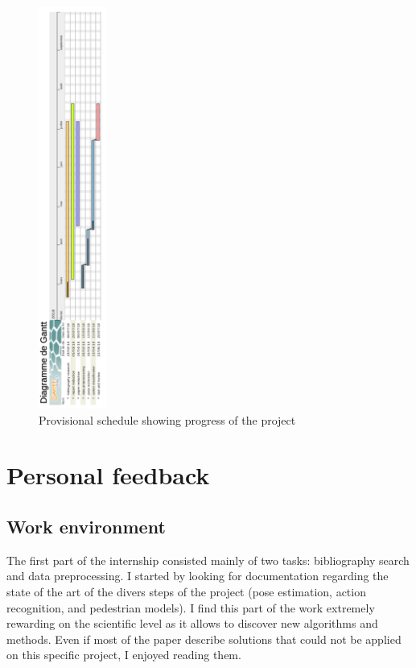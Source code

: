 \documentclass[12pt,a4paper,twoside]{article}
\begin{document}
\begin{figure}
    \centering
        \includegraphics[width=0.2\textwidth]{images/gantt}
    \caption{Provisional schedule showing progress of the project}
\label{fig:gantt}
\end{figure}

\newpage

\section{Personal feedback}

\subsection{Work environment}
The first part of the internship consisted mainly of two tasks: bibliography search and data preprocessing. I started by looking for documentation regarding the state of the art of the divers steps of the project (pose estimation, action recognition, and pedestrian models). I find this part of the work extremely rewarding on the scientific level as it allows to discover new algorithms and methods. Even if most of the paper describe solutions that could not be applied on this specific project, I enjoyed reading them.
\end{document}
